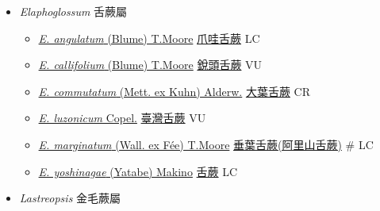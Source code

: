 \begin{itemize}
\begin{itemize}
  \end{itemize}
 \item[] \textit{Elaphoglossum} 舌蕨屬
                    
  \begin{itemize}
        \item[] \href{http://www.theplantlist.org/tpl1.1/search?q=Elaphoglossum+angulatum}{\textit{E. angulatum} (Blume) T.Moore}   \href{\detokenize{http://taibnet.sinica.edu.tw/chi/taibnet_species_list.php?T2=爪哇舌蕨&T2_new_value=true&fr=y}}{爪哇舌蕨} LC
        \item[] \href{http://www.theplantlist.org/tpl1.1/search?q=Elaphoglossum+callifolium}{\textit{E. callifolium} (Blume) T.Moore}   \href{\detokenize{http://taibnet.sinica.edu.tw/chi/taibnet_species_list.php?T2=銳頭舌蕨&T2_new_value=true&fr=y}}{銳頭舌蕨} VU
        \item[] \href{http://www.theplantlist.org/tpl1.1/search?q=Elaphoglossum+commutatum}{\textit{E. commutatum} (Mett. ex Kuhn) Alderw.}   \href{\detokenize{http://taibnet.sinica.edu.tw/chi/taibnet_species_list.php?T2=大葉舌蕨&T2_new_value=true&fr=y}}{大葉舌蕨} CR
        \item[] \href{http://www.theplantlist.org/tpl1.1/search?q=Elaphoglossum+luzonicum}{\textit{E. luzonicum} Copel.}   \href{\detokenize{http://taibnet.sinica.edu.tw/chi/taibnet_species_list.php?T2=臺灣舌蕨&T2_new_value=true&fr=y}}{臺灣舌蕨} VU
        \item[] \href{http://www.theplantlist.org/tpl1.1/search?q=Elaphoglossum+marginatum}{\textit{E. marginatum} (Wall. ex Fée) T.Moore}     \href{\detokenize{http://taibnet.sinica.edu.tw/chi/taibnet_species_list.php?T2=垂葉舌蕨&T2_new_value=true&fr=y}}{垂葉舌蕨(阿里山舌蕨)}  \# LC
        \item[] \href{http://www.theplantlist.org/tpl1.1/search?q=Elaphoglossum+yoshinagae}{\textit{E. yoshinagae} (Yatabe) Makino}   \href{\detokenize{http://taibnet.sinica.edu.tw/chi/taibnet_species_list.php?T2=舌蕨&T2_new_value=true&fr=y}}{舌蕨} LC
  \end{itemize}
 \item[] \textit{Lastreopsis} 金毛蕨屬
                    

\end{itemize}
